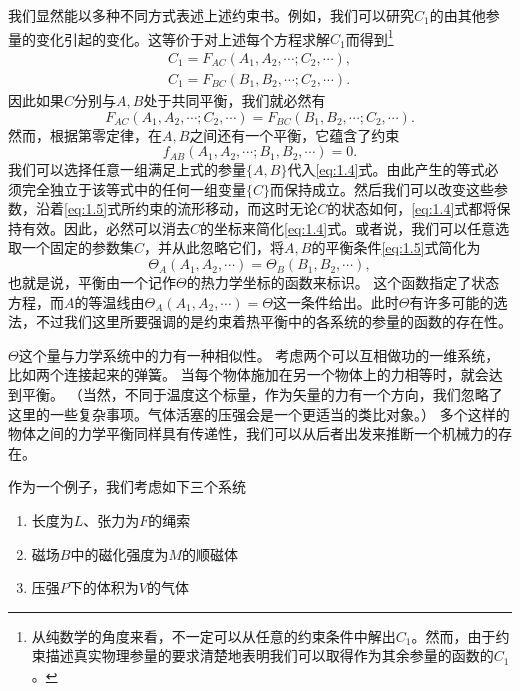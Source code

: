 	我们显然能以多种不同方式表述上述约束书。例如，我们可以研究\(C_1\)的由其他参量的变化引起的变化。这等价于对上述每个方程求解\(C_1\)而得到\footnote{从纯数学的角度来看，不一定可以从任意的约束条件中解出\(C_1\)。然而，由于约束描述真实物理参量的要求清楚地表明我们可以取得作为其余参量的函数的\(C_1\)。}
	\begin{equation}
		\begin{aligned}
			C_1=F_{AC}(A_1,A_2,\cdots;C_2,\cdots),\\
			C_1=F_{BC}(B_1,B_2,\cdots;C_2,\cdots).
		\end{aligned}
	\end{equation}
	因此如果\(C\)分别与$A,B$处于共同平衡，我们就必然有
	\begin{equation}\label{eq:1.4}
		F_{AC}(A_1,A_2,\cdots;C_2,\cdots)=F_{BC}(B_1,B_2,\cdots;C_2,\cdots).
	\end{equation}
	然而，根据第零定律，在\(A,B\)之间还有一个平衡，它蕴含了约束
	\begin{equation}\label{eq:1.5}
		f_{AB}(A_1,A_2,\cdots;B_1,B_2,\cdots)=0.
	\end{equation}
	我们可以选择任意一组满足上式的参量\(\{A, B\}\)代入\ref{eq:1.4}式。由此产生的等式必须完全独立于该等式中的任何一组变量\(\{C\}\)而保持成立。然后我们可以改变这些参数，沿着\ref{eq:1.5}式所约束的流形移动，而这时无论$C$的状态如何，\ref{eq:1.4}式都将保持有效。因此，必然可以消去$C$的坐标来简化\ref{eq:1.4}式。或者说，我们可以任意选取一个固定的参数集$C$，并从此忽略它们，将\(A,B\)的平衡条件\ref{eq:1.5}式简化为
	\begin{equation}
		\Theta_A(A_1,A_2,\cdots)=\Theta_B(B_1,B_2,\cdots),
	\end{equation}
	也就是说，平衡由一个记作$\Theta$的热力学坐标的函数来标识。
	这个函数指定了状态方程，而$A$的等温线由\(\Theta_A(A_1,A_2,\cdots)=\Theta\)这一条件给出。此时\(\Theta\)有许多可能的选法，不过我们这里所要强调的是约束着热平衡中的各系统的参量的函数的存在性。

	\(\Theta\)这个量与力学系统中的力有一种相似性。
	考虑两个可以互相做功的一维系统，比如两个连接起来的弹簧。
	当每个物体施加在另一个物体上的力相等时，就会达到平衡。
	（当然，不同于温度这个标量，作为矢量的力有一个方向，我们忽略了这里的一些复杂事项。气体活塞的压强会是一个更适当的类比对象。）
	多个这样的物体之间的力学平衡同样具有传递性，我们可以从后者出发来推断一个机械力的存在。

	作为一个例子，我们考虑如下三个系统
	\begin{enumerate}[label=(\Alph*)]
		\item 长度为$L$、张力为$F$的绳索
		\item 磁场$B$中的磁化强度为$M$的顺磁体
		\item 压强$P$下的体积为$V$的气体
	\end{enumerate}

